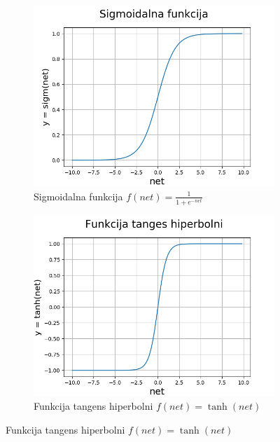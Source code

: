 \documentclass[times, utf8, diplomski]{fer}
\theoremstyle{definition}
\begin{document}
\begin{figure}
\begin{subfigure}[t]{.5\textwidth}
\centering
\includegraphics[width=\linewidth]{sigmoidalna_funkcija.png}
\caption{Sigmoidalna funkcija
$f(net) = \frac{1}{1 + e^{-net}}$
}
\end{subfigure}
\hfill
\begin{subfigure}[t]{.5\textwidth}
\centering
\includegraphics[width=\linewidth]{tanh_funkcija.png}
\caption{Funkcija tangens hiperbolni $f(net) = \tanh(net)$}
\end{subfigure}



\end{figure}
\end{document}
